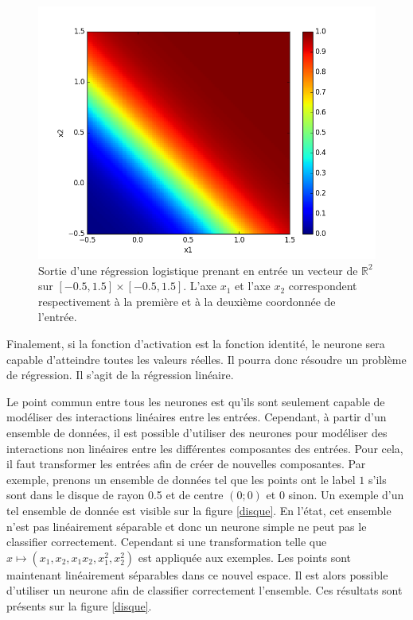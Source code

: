 \begin{figure}[H]
\begin{center}
\includegraphics[scale=0.5]{images/chapter1/or.png}
\caption{Sortie d'une régression logistique prenant en entrée un vecteur de $\mathbb{R}^2$ sur $[-0.5, 1.5] \times [-0.5, 1.5]$. L'axe $x_1$ et l'axe $x_2$ correspondent respectivement à la première et à la deuxième coordonnée de l'entrée.}
\label{regression_logistique}
\end{center}
\end{figure}

\begin{example}
Finalement, si la fonction d'activation est la fonction identité, le neurone sera capable d'atteindre toutes les valeurs réelles. Il pourra donc résoudre un problème de régression. Il s'agit de la régression linéaire.
\end{example}

Le point commun entre tous les neurones est qu'ils sont seulement capable de modéliser des interactions linéaires entre les entrées. Cependant, à partir d'un ensemble de données, il est possible d'utiliser des neurones pour modéliser des interactions non linéaires entre les différentes composantes des entrées. Pour cela, il faut transformer les entrées afin de créer de nouvelles composantes. Par exemple, prenons un ensemble de données tel que les points ont le label $1$ s'ils sont dans le disque de rayon 0.5 et de centre $(0;0)$ et $0$ sinon. Un exemple d'un tel ensemble de donnée est visible sur la figure \ref{disque}. En l'état, cet ensemble n'est pas linéairement séparable et donc un neurone simple ne peut pas le classifier correctement. Cependant si une transformation telle que $x \mapsto (x_1, x_2, x_1x_2, x_1^2, x_2^2)$ est appliquée aux exemples. Les points sont maintenant linéairement séparables dans ce nouvel espace. Il est alors possible d'utiliser un neurone afin de classifier correctement l'ensemble. Ces résultats sont présents sur la figure \ref{disque}.


